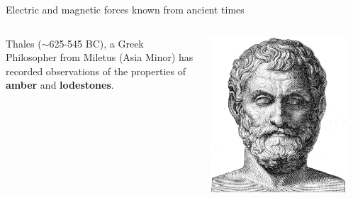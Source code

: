 %
%
%

\begin{frame}{Electric and magnetic forces known from ancient times}

\begin{columns}
    \begin{column}{0.90\textwidth}
    {\small
      Thales ($\sim$625-545 BC), a Greek Philosopher from Miletus (Asia Minor)
      has recorded observations of the properties of
      {\bf amber} and {\bf lodestones}.
    }
    \end{column}
    \begin{column}{0.10\textwidth}
      \begin{center}
         \includegraphics[width=0.90\textwidth]{./images/people/thales.jpg}\\
      \end{center}
    \end{column}
\end{columns}

\vspace{0.1cm}


\end{frame}
